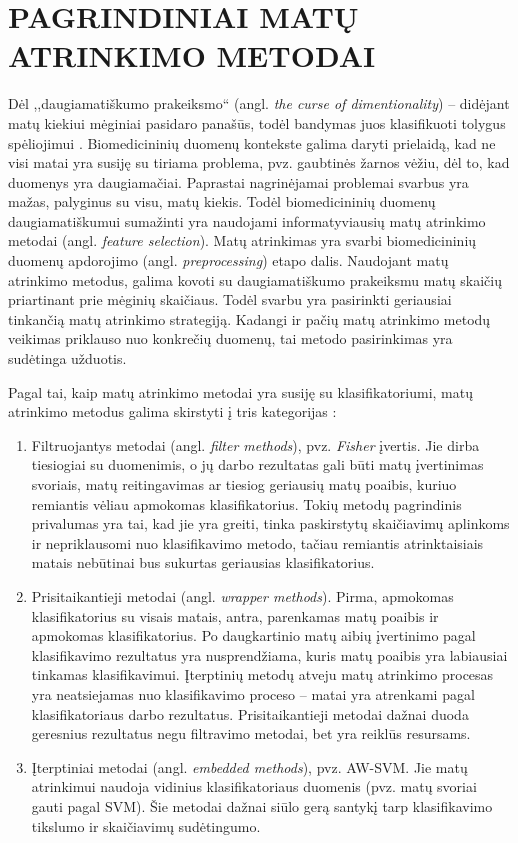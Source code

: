 \section{PAGRINDINIAI MATŲ ATRINKIMO METODAI}
\label{pagrindiniai_matu_atrinkimo_motodai}

Dėl ,,daugiamatiškumo prakeiksmo`` (angl. \textit{the curse of dimentionality}) -- didėjant matų kiekiui mėginiai pasidaro panašūs, todėl bandymas juos klasifikuoti tolygus spėliojimui \cite{bellman1966adaptive}. Biomedicininių duomenų kontekste galima daryti prielaidą, kad ne visi matai yra susiję su tiriama problema, pvz. gaubtinės žarnos vėžiu, dėl to, kad duomenys yra daugiamačiai. Paprastai nagrinėjamai problemai svarbus yra mažas, palyginus su visu, matų kiekis. Todėl biomedicininių duomenų daugiamatiškumui sumažinti yra naudojami informatyviausių matų atrinkimo metodai \cite{guyon2003introduction} (angl. \textit{feature selection}). Matų atrinkimas yra svarbi biomedicininių duomenų apdorojimo (angl. \textit{preprocessing}) etapo dalis. Naudojant matų atrinkimo metodus, galima kovoti su daugiamatiškumo prakeiksmu matų skaičių priartinant prie mėginių skaičiaus. Todėl svarbu yra pasirinkti geriausiai tinkančią matų atrinkimo strategiją. Kadangi ir pačių matų atrinkimo metodų veikimas priklauso nuo 
konkrečių duomenų, tai metodo pasirinkimas yra sudėtinga užduotis.

Pagal tai, kaip matų atrinkimo metodai yra susiję su klasifikatoriumi, matų atrinkimo metodus galima skirstyti į tris kategorijas \cite{saeys2008robust}:
\begin{enumerate}
 \item Filtruojantys metodai (angl. \textit{filter methods}), pvz. \textit{Fisher} įvertis. Jie dirba tiesiogiai su duomenimis, o jų darbo rezultatas gali būti matų įvertinimas svoriais, matų reitingavimas ar tiesiog geriausių matų poaibis, kuriuo remiantis vėliau apmokomas klasifikatorius. Tokių metodų pagrindinis privalumas yra tai, kad jie yra greiti, tinka paskirstytų skaičiavimų aplinkoms ir nepriklausomi nuo klasifikavimo  metodo, tačiau remiantis atrinktaisiais matais nebūtinai bus sukurtas geriausias klasifikatorius.
 \item Prisitaikantieji metodai (angl. \textit{wrapper methods}). Pirma, apmokomas klasifikatorius su visais matais, antra, parenkamas matų poaibis ir apmokomas klasifikatorius. Po daugkartinio matų aibių įvertinimo pagal klasifikavimo rezultatus yra nusprendžiama, kuris matų poaibis yra labiausiai tinkamas klasifikavimui. Įterptinių metodų atveju matų atrinkimo procesas yra neatsiejamas nuo klasifikavimo proceso -- matai yra atrenkami pagal klasifikatoriaus darbo rezultatus. Prisitaikantieji metodai dažnai duoda geresnius rezultatus negu filtravimo metodai, bet yra reiklūs resursams.
 \item Įterptiniai metodai (angl. \textit{embedded methods}), pvz. AW-SVM\cite{vapnik2000nature}. Jie matų atrinkimui naudoja vidinius klasifikatoriaus duomenis (pvz. matų svoriai gauti pagal SVM). Šie metodai dažnai siūlo gerą santykį tarp klasifikavimo tikslumo ir skaičiavimų sudėtingumo.
\end{enumerate}

